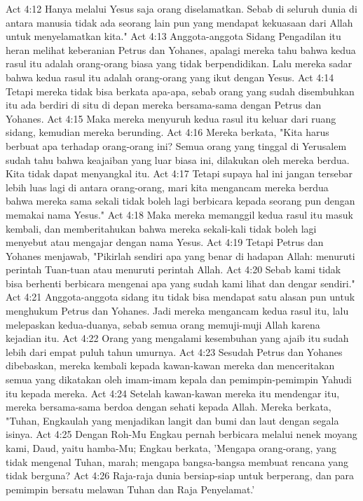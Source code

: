 Act 4:12  Hanya melalui Yesus saja orang diselamatkan. Sebab di seluruh dunia di antara manusia tidak ada seorang lain pun yang mendapat kekuasaan dari Allah untuk menyelamatkan kita."
Act 4:13  Anggota-anggota Sidang Pengadilan itu heran melihat keberanian Petrus dan Yohanes, apalagi mereka tahu bahwa kedua rasul itu adalah orang-orang biasa yang tidak berpendidikan. Lalu mereka sadar bahwa kedua rasul itu adalah orang-orang yang ikut dengan Yesus.
Act 4:14  Tetapi mereka tidak bisa berkata apa-apa, sebab orang yang sudah disembuhkan itu ada berdiri di situ di depan mereka bersama-sama dengan Petrus dan Yohanes.
Act 4:15  Maka mereka menyuruh kedua rasul itu keluar dari ruang sidang, kemudian mereka berunding.
Act 4:16  Mereka berkata, "Kita harus berbuat apa terhadap orang-orang ini? Semua orang yang tinggal di Yerusalem sudah tahu bahwa keajaiban yang luar biasa ini, dilakukan oleh mereka berdua. Kita tidak dapat menyangkal itu.
Act 4:17  Tetapi supaya hal ini jangan tersebar lebih luas lagi di antara orang-orang, mari kita mengancam mereka berdua bahwa mereka sama sekali tidak boleh lagi berbicara kepada seorang pun dengan memakai nama Yesus."
Act 4:18  Maka mereka memanggil kedua rasul itu masuk kembali, dan memberitahukan bahwa mereka sekali-kali tidak boleh lagi menyebut atau mengajar dengan nama Yesus.
Act 4:19  Tetapi Petrus dan Yohanes menjawab, "Pikirlah sendiri apa yang benar di hadapan Allah: menuruti perintah Tuan-tuan atau menuruti perintah Allah.
Act 4:20  Sebab kami tidak bisa berhenti berbicara mengenai apa yang sudah kami lihat dan dengar sendiri."
Act 4:21  Anggota-anggota sidang itu tidak bisa mendapat satu alasan pun untuk menghukum Petrus dan Yohanes. Jadi mereka mengancam kedua rasul itu, lalu melepaskan kedua-duanya, sebab semua orang memuji-muji Allah karena kejadian itu.
Act 4:22  Orang yang mengalami kesembuhan yang ajaib itu sudah lebih dari empat puluh tahun umurnya.
Act 4:23  Sesudah Petrus dan Yohanes dibebaskan, mereka kembali kepada kawan-kawan mereka dan menceritakan semua yang dikatakan oleh imam-imam kepala dan pemimpin-pemimpin Yahudi itu kepada mereka.
Act 4:24  Setelah kawan-kawan mereka itu mendengar itu, mereka bersama-sama berdoa dengan sehati kepada Allah. Mereka berkata, "Tuhan, Engkaulah yang menjadikan langit dan bumi dan laut dengan segala isinya.
Act 4:25  Dengan Roh-Mu Engkau pernah berbicara melalui nenek moyang kami, Daud, yaitu hamba-Mu; Engkau berkata, 'Mengapa orang-orang, yang tidak mengenal Tuhan, marah; mengapa bangsa-bangsa membuat rencana yang tidak berguna?
Act 4:26  Raja-raja dunia bersiap-siap untuk berperang, dan para pemimpin bersatu melawan Tuhan dan Raja Penyelamat.'
